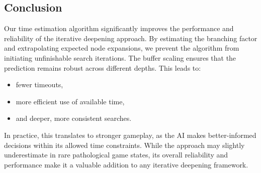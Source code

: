 \subsection*{Conclusion}

Our time estimation algorithm significantly improves the performance and reliability of the iterative deepening approach. By estimating the branching factor and extrapolating expected node expansions, we prevent the algorithm from initiating unfinishable search iterations. The buffer scaling ensures that the prediction remains robust across different depths. This leads to:

\begin{itemize}
    \item fewer timeouts,
    \item more efficient use of available time,
    \item and deeper, more consistent searches.
\end{itemize}

In practice, this translates to stronger gameplay, as the AI makes better-informed decisions within its allowed time constraints. While the approach may slightly underestimate in rare pathological game states, its overall reliability and performance make it a valuable addition to any iterative deepening framework.
